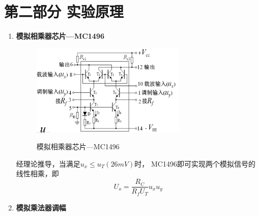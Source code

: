 \documentclass[UTF8]{ctexart}
\begin{document}
\section{第二部分 \texorpdfstring{\quad}{} 实验原理}
\begin{enumerate}
    \item \textbf{模拟相乘器芯片---MC1496}

    \begin{figure}[H]
        \centering
        \includegraphics[width=0.7\textwidth]{pics/2.1.png}
        ~\\
        \caption{模拟相乘器芯片---MC1496}\label{fig:2.1}
    \end{figure}

经理论推导，当满足$u_x ≤u_T (26mV)$时， MC1496即可实现两个模拟信号的线性相乘，即
$$U_o=\dfrac{R_C}{R_f U_T} u_x u_y$$

    \item \textbf{模拟乘法器调幅}
    

\end{enumerate}
\end{document}
